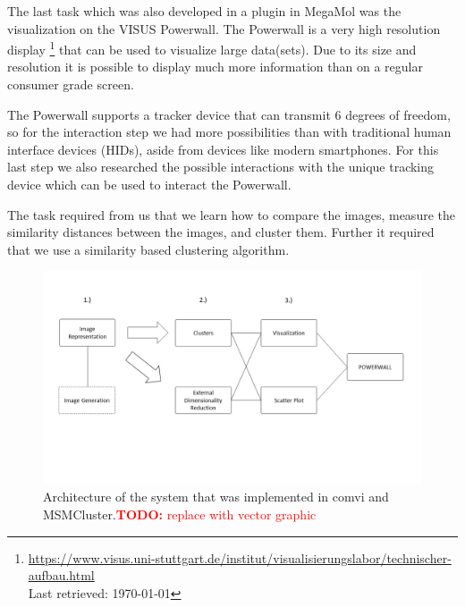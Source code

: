 \documentclass[journal]{vgtc}       %
\newcommand{\todo}[1]{\textcolor{red}{\textbf{TODO:} #1}}
\begin{document}
The last task which was also developed in a plugin in MegaMol was the visualization on the VISUS Powerwall. The Powerwall is a very high resolution display \footnote{\url{https://www.visus.uni-stuttgart.de/institut/visualisierungslabor/technischer-aufbau.html} \\ Last retrieved: \today } that can be used to visualize large data(sets). Due to its size and resolution it is possible to display much more information than on a regular consumer grade screen. 

The Powerwall supports a tracker device that can transmit 6 degrees of freedom, so for the interaction step we had more possibilities than with traditional human interface  devices  (HIDs), aside from devices like modern smartphones. For this last step we also researched the possible interactions with the unique tracking device  which can be used to interact the Powerwall.

The task required from us that we learn how to compare the images, measure the similarity  distances between the images, and cluster them. Further it  required that we use a similarity based clustering algorithm.
\begin{figure}[htbp]
	\begin{center}
		\includegraphics[width=.75\linewidth]{Folie1}
	\end{center}
	\caption{\label{fig:arch} Architecture of the system that was implemented in comvi and MSMCluster.\todo{replace with vector graphic}}
\end{figure} 

\end{document}
